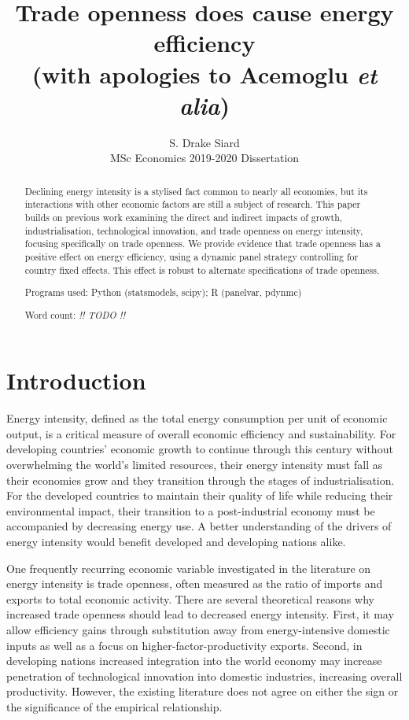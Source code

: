 \documentclass[12pt,a4paper]{article}
\title{\Large{\textbf{Trade openness does cause energy efficiency}}\\
\small{(with apologies to Acemoglu \emph{et alia})}}
\author{S. Drake Siard\\
MSc Economics 2019-2020 Dissertation}
\date{}
\newcommand{\pkg}[1]{{\fontseries{b}\selectfont #1}}
\begin{document}
\maketitle

\begin{abstract}
Declining energy intensity is a stylised fact common to nearly all economies, but its interactions with other economic factors are still a subject of research.
This paper builds on previous work examining the direct and indirect impacts of growth, industrialisation, technological innovation, and trade openness on energy intensity, focusing specifically on trade openness. 
We provide evidence that trade openness has a positive effect on energy efficiency, using a dynamic panel strategy controlling for country fixed effects.
This effect is robust to alternate specifications of trade openness. 



Programs used: Python (\pkg{statsmodels}, \pkg{scipy}); R (\pkg{panelvar}, \pkg{pdynmc})

Word count: \emph{!! TODO !!}
 
\end{abstract}

\pagebreak

\tableofcontents

\pagebreak

\section{Introduction}\label{sec:introduction}

Energy intensity, defined as the total energy consumption per unit of economic output, is a critical measure of overall economic efficiency and sustainability.
For developing countries' economic growth to continue through this century without overwhelming the world's limited resources, their energy intensity must fall as their economies grow and they transition through the stages of industrialisation.
For the developed countries to maintain their quality of life while reducing their environmental impact, their transition to a post-industrial economy must be accompanied by decreasing energy use.
A better understanding of the drivers of energy intensity would benefit developed and developing nations alike.

One frequently recurring economic variable investigated in the literature on energy intensity is trade openness, often measured as the ratio of imports and exports to total economic activity.
There are several theoretical reasons why increased trade openness should lead to decreased energy intensity.
First, it may allow efficiency gains through substitution away from energy-intensive domestic
inputs as well as a focus on higher-factor-productivity exports. 
Second, in developing nations increased integration into the world economy may increase penetration of technological innovation into domestic industries, increasing overall productivity.
However, the existing literature does not agree on either the sign or the significance of the empirical relationship.
\end{document}
